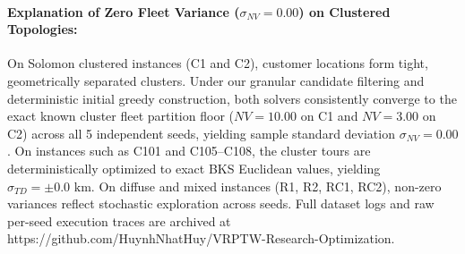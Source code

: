 \documentclass{article}
\begin{document}
\paragraph{Explanation of Zero Fleet Variance ($\sigma_{NV}=0.00$) on Clustered Topologies:} On Solomon clustered instances (C1 and C2), customer locations form tight, geometrically separated clusters. Under our granular candidate filtering and deterministic initial greedy construction, both solvers consistently converge to the exact known cluster fleet partition floor ($NV=10.00$ on C1 and $NV=3.00$ on C2) across all 5 independent seeds, yielding sample standard deviation $\sigma_{NV}=0.00$. On instances such as C101 and C105--C108, the cluster tours are deterministically optimized to exact BKS Euclidean values, yielding $\sigma_{TD}=\pm 0.0\text{ km}$. On diffuse and mixed instances (R1, R2, RC1, RC2), non-zero variances reflect stochastic exploration across seeds. Full dataset logs and raw per-seed execution traces are archived at \textsf{https://github.com/HuynhNhatHuy/VRPTW-Research-Optimization}.
\end{document}

